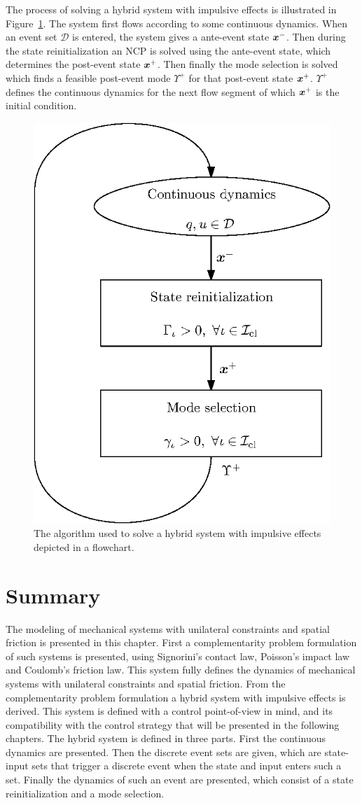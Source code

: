 \documentclass[../DC2017114Bouma.tex]{subfiles}
\begin{document}
The process of solving a hybrid system with impulsive effects is illustrated in Figure~\ref{fig:2hybridalg}. The system first flows according to some continuous dynamics. When an event set $\mathcal{D}$ is entered, the system gives a ante-event state ${\boldsymbol{x}}^-$. Then during the state reinitialization an NCP is solved using the ante-event state, which determines the post-event state ${\boldsymbol{x}}^+$. Then finally the mode selection is solved which finds a feasible post-event mode $\Upsilon^+$ for that post-event state ${\boldsymbol{x}}^+$. $\Upsilon^+$ defines the continuous dynamics for the next flow segment of which ${\boldsymbol{x}}^+$ is the initial condition.

\begin{figure}[h]
\centering
\includegraphics[width=.5\textwidth]{hybridalg.eps}\caption{The algorithm used to solve a hybrid system with impulsive effects depicted in a flowchart.} \label{fig:2hybridalg}
\end{figure}

\section{Summary}
The modeling of mechanical systems with unilateral constraints and spatial friction is presented in this chapter. First a complementarity problem formulation of such systems is presented, using Signorini's contact law, Poisson's impact law and Coulomb's friction law. This system fully defines the dynamics of mechanical systems with unilateral constraints and spatial friction. From the complementarity problem formulation a hybrid system with impulsive effects is derived. This system is defined with a control point-of-view in mind, and its compatibility with the control strategy that will be presented in the following chapters. The hybrid system is defined in three parts. First the continuous dynamics are presented. Then the discrete event sets are given, which are state-input sets that trigger a discrete event when the state and input enters such a set. Finally the dynamics of such an event are presented, which consist of a state reinitialization and a mode selection.
\end{document}
